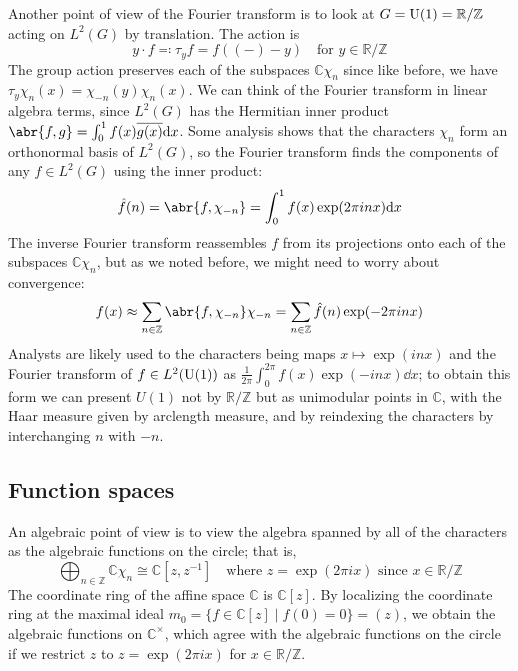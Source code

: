 \documentclass[../../rtnotes.tex]{subfiles}
\begin{document}
Another point of view of the Fourier transform is to look at $G = \operatorname{U}(1)= \mathbb R/\mathbb Z$ acting on $L^2(G)$ by translation. The action is 
\[y\cdot f \eqqcolon \tau_yf = f((-)-y)\quad \text{for }y\in\mathbb R/\mathbb Z\]
The group action preserves each of the subspaces $\mathbb C\chi_n$ since like before, we have $\tau_y\chi_n(x) = \chi_{-n}(y)\chi_n(x)$. We can think of the Fourier transform in linear algebra terms, since $L^2(G)$ has the Hermitian inner product $\abr{f,g} = \int_0^1f(x)\overline{g(x)}\dd x$. Some analysis shows that the characters $\chi_n$ form an orthonormal basis of $L^2(G)$, so the Fourier transform finds the components of any $f\in L^2(G)$ using the inner product:
\[\hat f(n) = \abr{f,\chi_{-n}} = \int_0^1 f(x)\exp(2\pi inx)\dd x\]
The inverse Fourier transform reassembles $f$ from its projections onto each of the subspaces $\mathbb C\chi_n$, but as we noted before, we might need to worry about convergence:
\[f(x) \approx \sum_{n\in\mathbb Z}\abr{f,\chi_{-n}}\chi_{-n} = \sum_{n\in\mathbb Z}\hat f(n)\exp(-2\pi i nx)\]
Analysts are likely used to the characters being maps $x\mapsto \exp(inx)$ and the Fourier transform of $f\in L^2(\operatorname{U}(1))$ as $\frac{1}{2\pi}\int_0^{2\pi}f(x)\exp(-inx)\dd x$; to obtain this form we can present $U(1)$ not by $\mathbb R/\mathbb Z$ but as unimodular points in $\mathbb C$, with the Haar measure given by arclength measure, and by reindexing the characters by interchanging $n$ with $-n$.

\subsection{Function spaces}
An algebraic point of view is to view the algebra spanned by all of the characters as the algebraic functions on the circle; that is,
\[\bigoplus_{n\in\mathbb Z}\mathbb C\chi_n\cong\mathbb C[z,z^{-1}]\quad\text{where $z = \exp(2\pi ix)$ since $x\in \mathbb R/\mathbb Z$}\]
The coordinate ring of the affine space $\mathbb C$ is $\mathbb C[z]$. By localizing the coordinate ring at the maximal ideal $m_0 = \{f\in \mathbb C[z]\mid f(0) = 0\} = (z)$, we obtain the algebraic functions on $\mathbb C^\times$, which agree with the algebraic functions on the circle if we restrict $z$ to $z = \exp(2\pi i x)$ for $x\in\mathbb R/\mathbb Z$.
\end{document}
